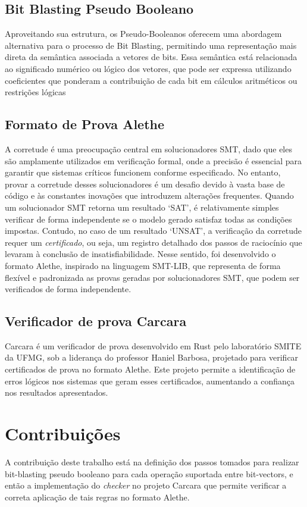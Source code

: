 \documentclass[conference]{IEEEtran}
\begin{document}
\subsection{Bit Blasting Pseudo Booleano}
Aproveitando sua estrutura, os Pseudo-Booleanos oferecem uma abordagem alternativa para o
processo de Bit Blasting, permitindo uma representação mais direta da semântica
associada a vetores de bits. Essa semântica está relacionada ao significado numérico ou lógico
dos vetores, que pode ser expressa utilizando coeficientes que ponderam a contribuição de cada
bit em cálculos aritméticos ou restrições lógicas


\subsection{Formato de Prova Alethe}
A corretude é uma preocupação central em solucionadores SMT, dado que eles são amplamente
utilizados em verificação formal, onde a precisão é essencial para garantir que sistemas críticos
funcionem conforme especificado. No entanto, provar a corretude desses solucionadores é um desafio
devido à vasta base de código e às constantes inovações que introduzem alterações frequentes.
Quando um solucionador SMT retorna um resultado `SAT', é relativamente simples verificar de forma
independente se o modelo gerado satisfaz todas as condições impostas. Contudo, no caso de um
resultado `UNSAT', a verificação da corretude requer um \textit{certificado}, ou seja, um registro
detalhado dos passos de raciocínio que levaram à conclusão de insatisfiabilidade.
Nesse sentido, foi desenvolvido o formato Alethe\cite{Alethe}, inspirado na linguagem SMT-LIB, que representa de
forma flexível e padronizada as provas geradas por solucionadores SMT, que podem ser verificados de
forma independente.


\subsection{Verificador de prova Carcara}
Carcara\cite{Carcara} é um verificador de prova desenvolvido em Rust pelo laboratório SMITE da UFMG,
sob a liderança do professor Haniel Barbosa, projetado para verificar certificados de prova no
formato Alethe. Este projeto permite a identificação de erros lógicos nos sistemas que geram
esses certificados, aumentando a confiança nos resultados apresentados.

\section{Contribuições}
A contribuição deste trabalho está na definição dos passos tomados para realizar bit-blasting
pseudo booleano para cada operação suportada entre bit-vectors, e então a implementação do
\textit{checker} no projeto Carcara que permite verificar a correta aplicação de tais regras
no formato Alethe.
\end{document}
